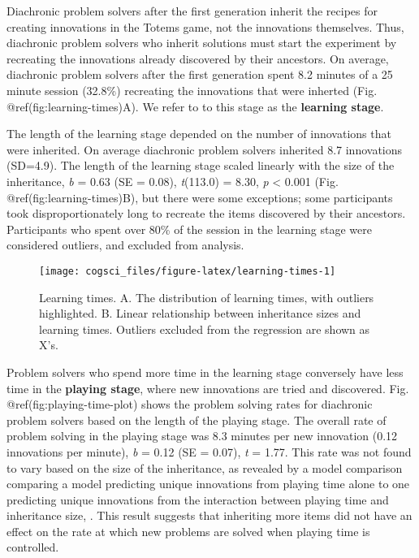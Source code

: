 \documentclass[10pt, letterpaper]{article}
\newenvironment{CodeChunk}{}{}
\begin{document}
Diachronic problem solvers after the first generation inherit the
recipes for creating innovations in the Totems game, not the innovations
themselves. Thus, diachronic problem solvers who inherit solutions must
start the experiment by recreating the innovations already discovered by
their ancestors. On average, diachronic problem solvers after the first
generation spent 8.2 minutes of a 25 minute session (32.8\%) recreating
the innovations that were inherted (Fig. @ref(fig:learning-times)A). We
refer to to this stage as the \textbf{learning stage}.

The length of the learning stage depended on the number of innovations
that were inherited. On average diachronic problem solvers inherited 8.7
innovations (SD=4.9). The length of the learning stage scaled linearly
with the size of the inheritance, \emph{b} = 0.63 (SE = 0.08),
\emph{t}(113.0) = 8.30, \emph{p} \textless{} 0.001 (Fig.
@ref(fig:learning-times)B), but there were some exceptions; some
participants took disproportionately long to recreate the items
discovered by their ancestors. Participants who spent over 80\% of the
session in the learning stage were considered outliers, and excluded
from analysis.

\begin{CodeChunk}
\begin{figure*}[tb]
\texttt{[image: cogsci\_files/figure-latex/learning-times-1]} \caption[Learning times]{Learning times. A. The distribution of learning times, with outliers highlighted. B. Linear relationship between inheritance sizes and learning times. Outliers excluded from the regression are shown as X's.}\label{fig:learning-times}
\end{figure*}
\end{CodeChunk}

Problem solvers who spend more time in the learning stage conversely
have less time in the \textbf{playing stage}, where new innovations are
tried and discovered. Fig. @ref(fig:playing-time-plot) shows the problem
solving rates for diachronic problem solvers based on the length of the
playing stage. The overall rate of problem solving in the playing stage
was 8.3 minutes per new innovation (0.12 innovations per minute),
\emph{b} = 0.12 (SE = 0.07), \emph{t} = 1.77. This rate was not found to
vary based on the size of the inheritance, as revealed by a model
comparison comparing a model predicting unique innovations from playing
time alone to one predicting unique innovations from the interaction
between playing time and inheritance size, . This result suggests that
inheriting more items did not have an effect on the rate at which new
problems are solved when playing time is controlled.
\end{document}
